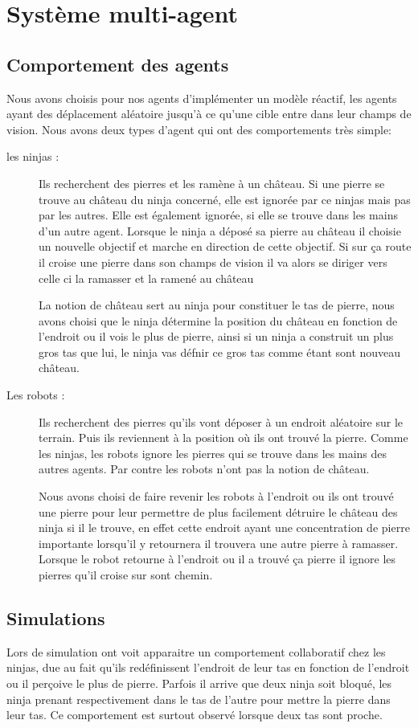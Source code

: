 \section{Système multi-agent}
\thispagestyle{fancy}
\subsection{Comportement des agents}
Nous avons choisis pour nos agents d'implémenter un modèle réactif,
les agents ayant des déplacement aléatoire jusqu'à ce qu'une cible
entre dans leur champs de vision. Nous avons deux types d'agent qui
ont des comportements très simple:


\begin{description}
\item[les ninjas :] 
  Ils recherchent des pierres et les ramène à un château. Si une pierre se trouve au château du ninja concerné, elle est ignorée par ce ninjas mais pas par les autres. Elle est également ignorée, si elle se trouve dans les mains d'un autre agent.
  Lorsque le ninja a déposé sa pierre au château il choisie un nouvelle objectif et marche en direction de cette objectif. Si sur ça route il croise une pierre dans son champs de vision il va alors se diriger vers celle ci la ramasser et la ramené au château
  
  La notion de château sert au ninja pour constituer le tas de pierre, nous avons choisi que le ninja détermine la position du château en fonction de l'endroit ou il vois le plus de pierre, ainsi si un ninja a construit un plus gros tas que lui, le ninja vas défnir ce gros tas comme étant sont nouveau château. 
\item[Les robots :]
  Ils recherchent des pierres qu'ils vont déposer à un endroit aléatoire sur le terrain. Puis ils reviennent à la position où ils ont trouvé la pierre. Comme les ninjas, les robots ignore les pierres qui se trouve dans les mains des autres agents. Par contre les robots n'ont pas la notion de château.
  
  Nous avons choisi de faire revenir les robots à l'endroit ou ils ont trouvé une pierre pour leur permettre de plus facilement détruire le château des ninja si il le trouve, en effet cette endroit ayant une concentration de pierre importante lorsqu'il y retournera il trouvera une autre pierre à ramasser. Lorsque le robot retourne à l'endroit ou il a trouvé ça pierre il ignore les pierres qu'il croise sur sont chemin.
\end{description}

\subsection{Simulations}
Lors de simulation ont voit apparaitre un comportement collaboratif chez les ninjas, due au fait qu'ils redéfinissent l'endroit de leur tas en fonction de l'endroit ou il perçoive le plus de pierre. Parfois il arrive que deux ninja soit bloqué, les ninja prenant respectivement dans le tas de l'autre pour mettre la pierre dans leur tas. Ce comportement est surtout observé lorsque deux tas sont proche.

